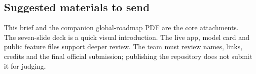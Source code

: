 \subsection{Suggested materials to send}
This brief and the companion global-roadmap PDF are the core attachments. The seven-slide deck is a quick visual introduction. The live app, model card and public feature files support deeper review. The team must review names, links, credits and the final official submission; publishing the repository does not submit it for judging.



